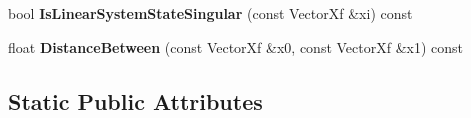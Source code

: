 \begin{DoxyCompactItemize}
\item 
bool {\bfseries Is\+Linear\+System\+State\+Singular} (const Vector\+Xf \&xi) const \hypertarget{classilqgames_1_1_single_player_flat_unicycle4_d_aed29c096ed0b7d5a90bdda3663d27f48}{}\label{classilqgames_1_1_single_player_flat_unicycle4_d_aed29c096ed0b7d5a90bdda3663d27f48}

\item 
float {\bfseries Distance\+Between} (const Vector\+Xf \&x0, const Vector\+Xf \&x1) const \hypertarget{classilqgames_1_1_single_player_flat_unicycle4_d_a1ee1aefcf9dac3271e19759da30efada}{}\label{classilqgames_1_1_single_player_flat_unicycle4_d_a1ee1aefcf9dac3271e19759da30efada}

\end{DoxyCompactItemize}
\subsection*{Static Public Attributes}
